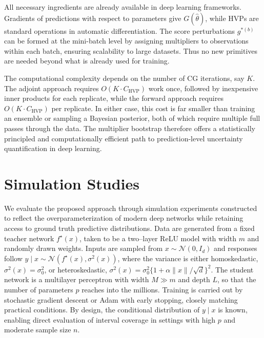 \documentclass[12pt, titlepage, reqno]{article}
\begin{document}
All necessary ingredients are already available in deep learning
frameworks. Gradients of predictions with respect to parameters give
$G(\hat\theta)$, while HVPs are standard operations in automatic
differentiation. The score perturbations $g^{*(b)}$ can be formed at
the mini-batch level by assigning multipliers to observations within
each batch, ensuring scalability to large datasets. Thus no new
primitives are needed beyond what is already used for training.


The computational complexity depends on the number of CG iterations,
say $K$. The adjoint approach requires $O(K \cdot C_{\text{HVP}})$
work once, followed by inexpensive inner products for each replicate,
while the forward approach requires $O(K \cdot C_{\text{HVP}})$ per
replicate. In either case, this cost is far smaller than training an
ensemble or sampling a Bayesian posterior, both of which require
multiple full passes through the data. The multiplier bootstrap
therefore offers a statistically principled and computationally
efficient path to prediction-level uncertainty quantification in deep
learning.

\section{Simulation Studies}

We evaluate the proposed approach through simulation experiments
constructed to reflect the overparameterization of modern deep
networks while retaining access to ground truth predictive
distributions. Data are generated from a fixed teacher network
$f^\star(x)$, taken to be a two–layer ReLU model with width $m$ and
randomly drawn weights. Inputs are sampled from
$x\sim\mathcal{N}(0,I_d)$ and responses follow
$y\mid x \sim \mathcal{N}(f^\star(x),\sigma^2(x))$, where the variance
is either homoskedastic, $\sigma^2(x)=\sigma_0^2$, or heteroskedastic,
$\sigma^2(x)=\sigma_0^2\{1+\alpha \|x\|/\sqrt{d}\}^2$. The student
network is a multilayer perceptron with width $M\gg m$ and depth $L$,
so that the number of parameters $p$ reaches into the millions.
Training is carried out by stochastic gradient descent or Adam with
early stopping, closely matching practical conditions. By design, the
conditional distribution of $y\mid x$ is known, enabling direct
evaluation of interval coverage in settings with high $p$ and moderate
sample size $n$.
\end{document}
